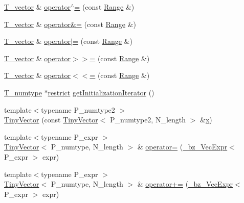 \begin{DoxyCompactItemize}
\hyperlink{classTinyVector_aea08e4463006acf6842a93c026b27094}{T\+\_\+vector} \& \hyperlink{classTinyVector_ae25517e6ee6d436a9e9e14f7f6695514}{operator$^\wedge$=} (const \hyperlink{classRange}{Range} \&)
\item 
\hyperlink{classTinyVector_aea08e4463006acf6842a93c026b27094}{T\+\_\+vector} \& \hyperlink{classTinyVector_a1933c39e44d5158a8d363bc054869a14}{operator\&=} (const \hyperlink{classRange}{Range} \&)
\item 
\hyperlink{classTinyVector_aea08e4463006acf6842a93c026b27094}{T\+\_\+vector} \& \hyperlink{classTinyVector_a5799113ebd93898fda8f253a4451fa78}{operator$\vert$=} (const \hyperlink{classRange}{Range} \&)
\item 
\hyperlink{classTinyVector_aea08e4463006acf6842a93c026b27094}{T\+\_\+vector} \& \hyperlink{classTinyVector_a499f0c69d4250ce0cc684fa28fefd375}{operator$>$$>$=} (const \hyperlink{classRange}{Range} \&)
\item 
\hyperlink{classTinyVector_aea08e4463006acf6842a93c026b27094}{T\+\_\+vector} \& \hyperlink{classTinyVector_ab195ff159ed80535527e29c6f9d63edc}{operator$<$$<$=} (const \hyperlink{classRange}{Range} \&)
\item 
\hyperlink{classTinyVector_ab8e7df758dd5a369e92b3cb54a48bdbe}{T\+\_\+numtype} $\ast$\hyperlink{compiler_8h_a080abdcb9c02438f1cd2bb707af25af8}{restrict} \hyperlink{classTinyVector_a87fb14363e0cfedd906471832be9d69a}{get\+Initialization\+Iterator} ()
\item 
{\footnotesize template$<$typename P\+\_\+numtype2 $>$ }\\\hyperlink{classTinyVector_a85298a2ac5ac8f0478da77179e62898d}{Tiny\+Vector} (const \hyperlink{classTinyVector}{Tiny\+Vector}$<$ P\+\_\+numtype2, N\+\_\+length $>$ \&\hyperlink{vecnorm1_8cc_ac73eed9e41ec09d58f112f06c2d6cb63}{x})
\item 
{\footnotesize template$<$typename P\+\_\+expr $>$ }\\\hyperlink{classTinyVector}{Tiny\+Vector}$<$ P\+\_\+numtype, N\+\_\+length $>$ \& \hyperlink{classTinyVector_a01eee326ec972bccb7ce7f4c41edcac4}{operator=} (\hyperlink{class__bz__VecExpr}{\+\_\+bz\+\_\+\+Vec\+Expr}$<$ P\+\_\+expr $>$ expr)
\item 
{\footnotesize template$<$typename P\+\_\+expr $>$ }\\\hyperlink{classTinyVector}{Tiny\+Vector}$<$ P\+\_\+numtype, N\+\_\+length $>$ \& \hyperlink{classTinyVector_a87d9dbab776884f60507a8552a777722}{operator+=} (\hyperlink{class__bz__VecExpr}{\+\_\+bz\+\_\+\+Vec\+Expr}$<$ P\+\_\+expr $>$ expr)

\end{DoxyCompactItemize}
